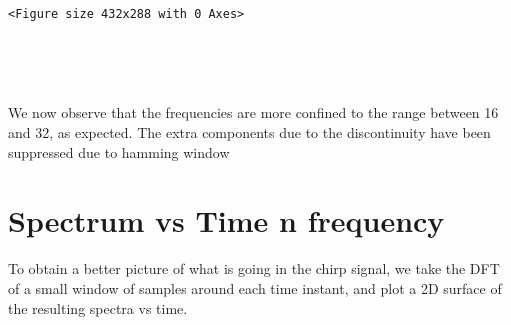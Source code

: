\documentclass[11pt]{article}
\begin{document}
    \begin{center}
    \end{center}
    { \hspace*{\fill} \\}
    
    
    \begin{verbatim}
<Figure size 432x288 with 0 Axes>
    \end{verbatim}

    
    \begin{center}
    \end{center}
    { \hspace*{\fill} \\}
    
    \begin{center}
    \end{center}
    { \hspace*{\fill} \\}
    
    We now observe that the frequencies are more confined to the range
between 16 and 32, as expected. The extra components due to the
discontinuity have been suppressed due to hamming window

    \section{Spectrum vs Time n
frequency}\label{spectrum-vs-time-n-frequency}

    To obtain a better picture of what is going in the chirp signal, we take
the DFT of a small window of samples around each time instant, and plot
a 2D surface of the resulting spectra vs time.
\end{document}
